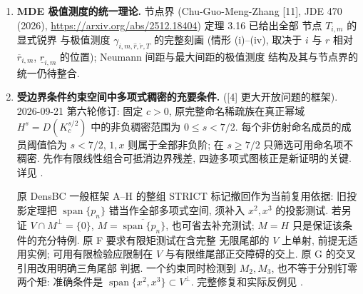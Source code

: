 \documentclass[UTF8]{ctexart}
\begin{document}
\begin{enumerate}
		$q\ge0$ (Gan-Zheng-Li-Shao 线 [8]) 与变号权重的最优常数与极值
		结构仍待确定.
	\item \textbf{MDE 极值测度的统一理论.}
		节点界 (Chu-Guo-Meng-Zhang [11], JDE 470 (2026),
		\url{https://arxiv.org/abs/2512.18404}) 定理 3.16 已给出全部
		节点 $T_{i,m}$ 的显式锐界
		与极值测度 $\gamma_{i,m,\hat r,\check r,T}$ 的完整刻画
		(情形 (i)--(iv), 取决于 $i$ 与 $r$ 相对 $\overline r_{i,m}$,
		$\underline r_{i,m}$ 的位置); Neumann 间距与最大间距的极值测度
		结构及其与节点界的统一仍待整合.
	\item \textbf{受边界条件约束空间中多项式稠密的充要条件.}
        ([4] 更大开放问题的框架). 2026-09-21 第六轮修订: 固定 $c>0$,
        原完整命名稀疏族在真正幂域 $H^s=D(K_c^{s/2})$ 中的非负稠密范围为
        $0\le s<7/2$. 每个非仿射命名成员的成员阈值恰为 $s<7/2$,
        $1,x$ 则属于全部非负阶; 在 $s\ge7/2$ 只筛选可用命名项不稠密.
        先作有限线性组合可抵消边界残差, 四迹多项式图核正是新证明的关键.
        详见 .

        原 DensBC 一般框架 A--H 的整组 STRICT 标记撤回作为当前复用依据:
        旧投影定理把 $\operatorname{span}\{p_n\}$ 错当作全部多项式空间, 须补入
        $x^2,x^3$ 的投影测试. 若另证 $V\cap M^\perp=\{0\}$, $M=\overline{\operatorname{span}\{p_n\}}$,
        也可省去补充测试; $M=H$ 只是保证该条件的充分特例. 原 F 要求有限矩测试在含完整
        无限尾部的 $V$ 上单射, 前提无适用实例; 可用有限检验应限制在
        $V$ 与有限维尾部正交障碍的交上. 原 G 的交叉引用改用明确三角尾部
        判据. 一个约束同时检测到 $M_2,M_3$, 也不等于分别钉零两个矩:
        准确条件是 $\operatorname{span}\{x^2,x^3\}\subset V^\perp$.
        完整修复和实际反例见 .


\end{enumerate}
\end{document}
